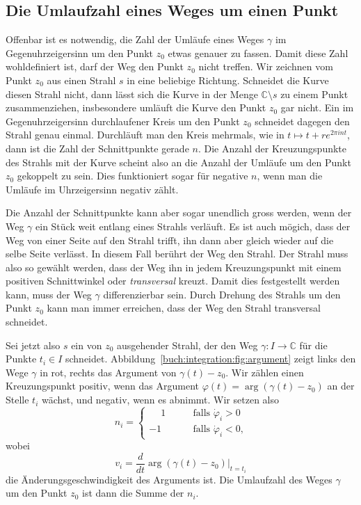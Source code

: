 %
%
%
\subsection{Die Umlaufzahl eines Weges um einen Punkt}
Offenbar ist es notwendig, die Zahl der Umläufe eines Weges $\gamma$
im Gegenuhrzeigersinn um den Punkt $z_0$ etwas genauer zu fassen.
%
Damit diese Zahl wohldefiniert ist, darf der Weg den Punkt $z_0$
nicht treffen.
Wir zeichnen vom Punkt $z_0$ aus einen Strahl $s$ in eine beliebige
Richtung.
Schneidet die Kurve diesen Strahl nicht, dann lässt sich die Kurve
in der Menge  $\mathbb{C}\setminus s$ zu einem Punkt zusammenziehen,
insbesondere umläuft die Kurve den Punkt $z_0$ gar nicht.
Ein im Gegenuhrzeigersinn durchlaufener Kreis um den Punkt $z_0$
%
%
schneidet dagegen den Strahl genau einmal.
Durchläuft man den Kreis mehrmals, wie in $t\mapsto t+re^{2\pi int}$,
dann ist die Zahl der Schnittpunkte gerade $n$.
Die Anzahl der Kreuzungspunkte des Strahls mit der Kurve scheint
also an die Anzahl der Umläufe um den Punkt $z_0$ gekoppelt zu sein.
Dies funktioniert sogar für negative $n$, wenn man die Umläufe im
Uhrzeigersinn negativ zählt.

Die Anzahl der Schnittpunkte kann aber sogar unendlich gross werden,
wenn der Weg $\gamma$ ein Stück weit entlang eines Strahls verläuft.
Es ist auch mögich, dass der Weg von einer Seite auf den Strahl trifft,
%
ihn dann aber gleich wieder auf die selbe Seite verlässt.
In diesem Fall berührt der Weg den Strahl.
Der Strahl muss also so gewählt werden, dass der Weg ihn in jedem
Kreuzungspunkt mit einem positiven Schnittwinkel oder \emph{transversal}
%
kreuzt.
Damit dies festgestellt werden kann, muss der Weg $\gamma$ differenzierbar
sein.
Durch Drehung des Strahls um den Punkt $z_0$ kann man immer erreichen,
dass der Weg den Strahl transversal schneidet.

Sei jetzt also $s$ ein von $z_0$ ausgehender Strahl, der den Weg 
$\gamma\colon I\to\mathbb{C}$ für die Punkte $t_i\in I$ schneidet.
%
Abbildung~\ref{buch:integration:fig:argument}
zeigt links den Wege $\gamma$ in rot, rechts das Argument von
$\gamma(t)-z_0$.
Wir zählen einen Kreuzungspunkt positiv, wenn das Argument 
\(
\varphi(t)
=
\operatorname{arg} (\gamma(t) - z_0)
\)
an der Stelle $t_i$ wächst, und negativ, wenn es abnimmt.
Wir setzen also
\begin{equation}
n_i
=
\begin{cases}
\phantom{-}1&\qquad \text{falls $\dot{\varphi}_i > 0$} \\
         - 1&\qquad \text{falls $\dot{\varphi}_i < 0$,} 
\end{cases}
\label{buch:integration:umlaufzahl:eqn:ni}
\end{equation}
wobei 
\[
v_i
=
\frac{d}{dt} \operatorname{arg}(\gamma(t)-z_0)\bigg|_{t=t_i}
\]
die Änderungsgeschwindigkeit des Arguments ist.
Die Umlaufzahl des Weges $\gamma$ um den Punkt $z_0$ ist dann die
Summe der $n_i$.

